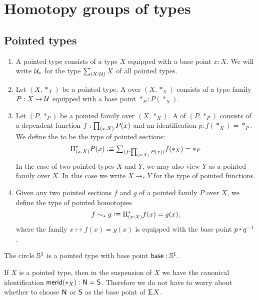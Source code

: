 \chapter{Homotopy groups of types}

\section{Pointed types}

\begin{defn}
\begin{enumerate}
\item A pointed type consists of a type $X$ equipped with a base point $x:X$. We will write $\mathcal{U}_\ast$ for the type $\sm{X:\UU}X$ of all pointed types.
\item Let $(X,\ast_X)$ be a pointed type. A  over $(X,\ast_X)$ consists of a type family $P:X\to \mathcal{U}$ equipped with a base point $\ast_P:P(\ast_X)$. 
\item Let $(P,\ast_P)$ be a pointed family over $(X,\ast_X)$. A  of $(P,\ast_P)$ consists of a dependent function $f:\prd{x:X}P(x)$ and an identification $p:f(\ast_X)=\ast_P$. We define the  to be the type of pointed sections:
\begin{equation*}
\Pi^\ast_{(x:X)}P(x) \defeq \sm{f:\prd{x:X}P(x)}f(\ast_X)=\ast_P
\end{equation*}
In the case of two pointed types $X$ and $Y$, we may also view $Y$ as a pointed family over $X$. In this case we write $X\to_\ast Y$ for the type of pointed functions.
\item Given any two pointed sections $f$ and $g$ of a pointed family $P$ over $X$, we define the type of pointed homotopies
\begin{equation*}
f\sim_\ast g \vcentcolon\equiv \Pi^\ast_{(x:X)} f(x)=g(x),
\end{equation*}
where the family $x\mapsto f(x)=g(x)$ is equipped with the base point $\ct{p}{q^{-1}}$. 
\end{enumerate}
\end{defn}

\begin{eg}
The circle $\mathbb{S}^{1}$ is a pointed type with base point $\mathsf{base}:\mathbb{S}^{1}$.
\end{eg}

\begin{eg}
If $X$ is a pointed type, then in the suspension of $X$ we have the canonical identification $\mathsf{merid}(\ast_X):\mathsf{N}=\mathsf{S}$. Therefore we do not have to worry about whether to choose $\mathsf{N}$ or $\mathsf{S}$ as the base point of $\mathsf{\Sigma}^{}{X}$. 
\end{eg} 

